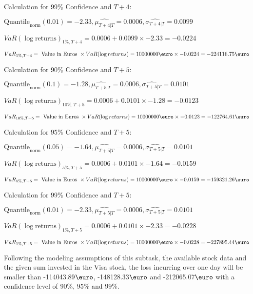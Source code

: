 Calculation for 99\% Confidence and $T+4$:

\indent\indent $\text{Quantile}_\text{norm}(0.01) = -2.33,\hat{\mu_{T+4|T}} = 0.0006, \hat{\sigma_{T+4|T}} = 0.0099$

\indent\indent $VaR(\log \text{returns})_{1\%, T + 4} = 0.0006 + 0.0099\times-2.33 = -0.0224$

\indent\indent $VaR_{1\%, T + 4} = \text{ Value in Euros } \times VaR(\log returns) = 10 000 000 \text{\euro} \times-0.0224 = -224116.75 \text{\euro}$\newline




Calculation for 90\% Confidence and $T+5$:

\indent\indent $\text{Quantile}_\text{norm}(0.1) = -1.28,\hat{\mu_{T+5|T}} = 0.0006, \hat{\sigma_{T+5|T}} = 0.0101$

\indent\indent $VaR(\log \text{returns})_{10\%, T + 5} = 0.0006 + 0.0101\times-1.28 = -0.0123$

\indent\indent $VaR_{10\%, T + 5} = \text{ Value in Euros } \times VaR(\log returns) = 10 000 000 \text{\euro} \times-0.0123 = -122764.61 \text{\euro}$\newline




Calculation for 95\% Confidence and $T+5$:

\indent\indent $\text{Quantile}_\text{norm}(0.05) = -1.64,\hat{\mu_{T+5|T}} = 0.0006, \hat{\sigma_{T+5|T}} = 0.0101$

\indent\indent $VaR(\log \text{returns})_{5\%, T + 5} = 0.0006 + 0.0101\times-1.64 = -0.0159$

\indent\indent $VaR_{5\%, T + 5} = \text{ Value in Euros } \times VaR(\log returns) = 10 000 000 \text{\euro} \times-0.0159 = -159321.26 \text{\euro}$\newline




Calculation for 99\% Confidence and $T+5$:

\indent\indent $\text{Quantile}_\text{norm}(0.01) = -2.33,\hat{\mu_{T+5|T}} = 0.0006, \hat{\sigma_{T+5|T}} = 0.0101$

\indent\indent $VaR(\log \text{returns})_{1\%, T + 5} = 0.0006 + 0.0101\times-2.33 = -0.0228$

\indent\indent $VaR_{1\%, T + 5} = \text{ Value in Euros } \times VaR(\log returns) = 10 000 000 \text{\euro} \times-0.0228 = -227895.44 \text{\euro}$\newline


Following the modeling assumptions of this subtask, the available stock data and the given sum invested in the Visa stock, the loss incurring over one day will be smaller than -114043.89$\text{\euro}$, -148128.33$\text{\euro}$  and -212065.07$\text{\euro}$  with a confidence level of 90\%, 95\%  and 99\%.

